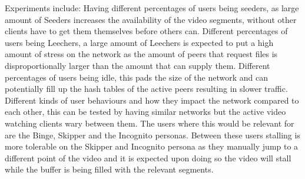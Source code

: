 Experiments include:
Having different percentages of users being seeders, as large amount of Seeders increases the availability of the video segments, without other clients have to get them themselves before others can.
Different percentages of users being Leechers, a large amount of Leechers is expected to put a high amount of stress on the network as the amount of peers that request files is disproportionally larger than the amount that can supply them.
Different percentages of users being idle, this pads the size of the network and can potentially fill up the hash tables of the active peers resulting in slower traffic.
Different kinds of user behaviours and how they impact the network compared to each other, this can be tested by having similar networks but the active video watching clients wary between them. The users where this would be relevant for are the Binge, Skipper and the Incognito personas. Between these users stalling is more tolerable on the Skipper and Incognito persona as they manually jump to a different point of the video and it is expected upon doing so the video will stall while the buffer is being filled with the relevant segments.
